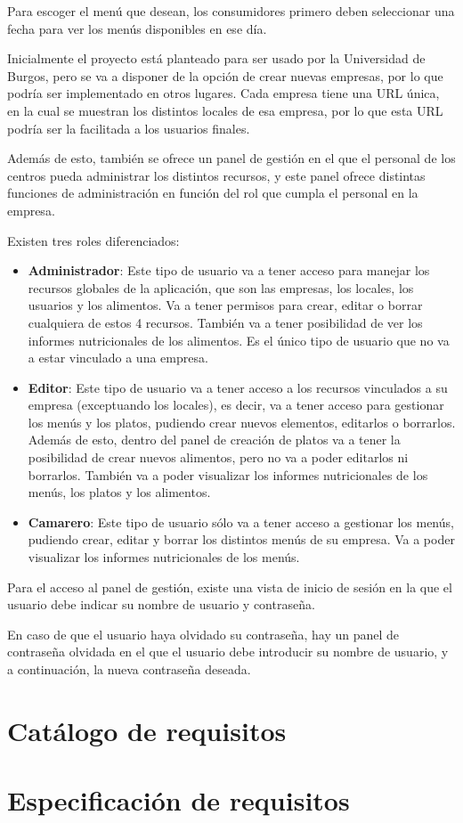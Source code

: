 Para escoger el menú que desean, los consumidores primero deben seleccionar una fecha para ver los menús disponibles en ese día.

Inicialmente el proyecto está planteado para ser usado por la Universidad de Burgos, pero se va a disponer de la opción de crear nuevas empresas, por lo que podría ser implementado en otros lugares. Cada empresa tiene una URL única, en la cual se muestran los distintos locales de esa empresa, por lo que esta URL podría ser la facilitada a los usuarios finales.

Además de esto, también se ofrece un panel de gestión en el que el personal de los centros pueda administrar los distintos recursos, y este panel ofrece distintas funciones de administración en función del rol que cumpla el personal en la empresa.

Existen tres roles diferenciados:

\begin{itemize}
	\item \textbf{Administrador}: Este tipo de usuario va a tener acceso para manejar los recursos globales de la aplicación, que son las empresas, los locales, los usuarios y los alimentos. Va a tener permisos para crear, editar o borrar cualquiera de estos 4 recursos. También va a tener posibilidad de ver los informes nutricionales de los alimentos. Es el único tipo de usuario que no va a estar vinculado a una empresa. 
	\item \textbf{Editor}: Este tipo de usuario va a tener acceso a los recursos vinculados a su empresa (exceptuando los locales), es decir, va a tener acceso para gestionar los menús y los platos, pudiendo crear nuevos elementos, editarlos o borrarlos. Además de esto, dentro del panel de creación de platos va a tener la posibilidad de crear nuevos alimentos, pero no va a poder editarlos ni borrarlos. También va a poder visualizar los informes nutricionales de los menús, los platos y los alimentos.
	\item \textbf{Camarero}: Este tipo de usuario sólo va a tener acceso a gestionar los menús, pudiendo crear, editar y borrar los distintos menús de su empresa. Va a poder visualizar los informes nutricionales de los menús.
\end{itemize}

Para el acceso al panel de gestión, existe una vista de inicio de sesión en la que el usuario debe indicar su nombre de usuario y contraseña. 

En caso de que el usuario haya olvidado su contraseña, hay un panel de contraseña olvidada en el que el usuario debe introducir su nombre de usuario, y a continuación, la nueva contraseña deseada.


\section{Catálogo de requisitos}


\section{Especificación de requisitos}




